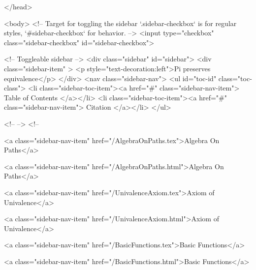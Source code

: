   
</head>




  <body>
    <!-- Target for toggling the sidebar `.sidebar-checkbox` is for regular
     styles, `#sidebar-checkbox` for behavior. -->
<input type="checkbox" class="sidebar-checkbox" id="sidebar-checkbox">

<!-- Toggleable sidebar -->
<div class="sidebar" id="sidebar">
  <div class="sidebar-item" >
    <p style="text-decoration:left">Pi preserves equivalence</p>
  </div>
  <nav class="sidebar-nav">
    <ul id="toc-id" class="toc-class">
  <li class="sidebar-toc-item"><a href="#" class="sidebar-nav-item"> Table of Contents </a></li>
  <li class="sidebar-toc-item"><a href="#" class="sidebar-nav-item"> Citation </a></li>
</ul>


    <!--  -->
    <!-- 
      
    
      
    
      
    
      
        
      
    
      
        
          <a class="sidebar-nav-item" href="/AlgebraOnPaths.tex">Algebra On Paths</a>
        
      
    
      
        
          <a class="sidebar-nav-item" href="/AlgebraOnPaths.html">Algebra On Paths</a>
        
      
    
      
        
          <a class="sidebar-nav-item" href="/UnivalenceAxiom.tex">Axiom of Univalence</a>
        
      
    
      
        
          <a class="sidebar-nav-item" href="/UnivalenceAxiom.html">Axiom of Univalence</a>
        
      
    
      
        
          <a class="sidebar-nav-item" href="/BasicFunctions.tex">Basic Functions</a>
        
      
    
      
        
          <a class="sidebar-nav-item" href="/BasicFunctions.html">Basic Functions</a>
        
      
    
      
        
